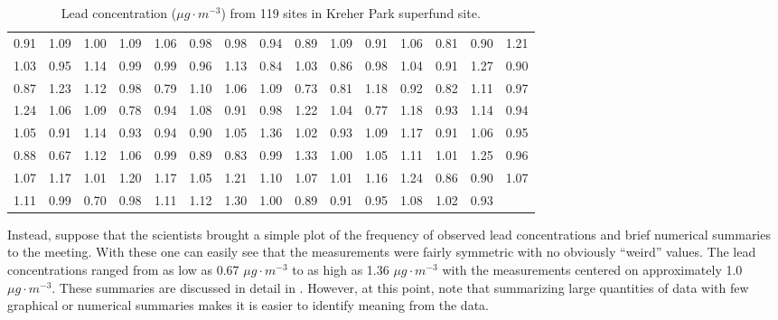 \documentclass[10pt,openany]{book}\usepackage[]{graphicx}\usepackage[]{color}
\begin{document}
\begin{table}[htbp]   \label{tab:KreherParkPbconc}
  \caption{Lead concentration ($\mu g \cdot m^{-3}$) from 119 sites in Kreher Park superfund site.}
  \begin{center}
\begin{tabular}{rrrrrrrrrrrrrrr}
  \hline
  \hline
0.91 & 1.09 & 1.00 & 1.09 & 1.06 & 0.98 & 0.98 & 0.94 & 0.89 & 1.09 & 0.91 & 1.06 & 0.81 & 0.90 & 1.21 \\ 
  1.03 & 0.95 & 1.14 & 0.99 & 0.99 & 0.96 & 1.13 & 0.84 & 1.03 & 0.86 & 0.98 & 1.04 & 0.91 & 1.27 & 0.90 \\ 
  0.87 & 1.23 & 1.12 & 0.98 & 0.79 & 1.10 & 1.06 & 1.09 & 0.73 & 0.81 & 1.18 & 0.92 & 0.82 & 1.11 & 0.97 \\ 
  1.24 & 1.06 & 1.09 & 0.78 & 0.94 & 1.08 & 0.91 & 0.98 & 1.22 & 1.04 & 0.77 & 1.18 & 0.93 & 1.14 & 0.94 \\ 
  1.05 & 0.91 & 1.14 & 0.93 & 0.94 & 0.90 & 1.05 & 1.36 & 1.02 & 0.93 & 1.09 & 1.17 & 0.91 & 1.06 & 0.95 \\ 
  0.88 & 0.67 & 1.12 & 1.06 & 0.99 & 0.89 & 0.83 & 0.99 & 1.33 & 1.00 & 1.05 & 1.11 & 1.01 & 1.25 & 0.96 \\ 
  1.07 & 1.17 & 1.01 & 1.20 & 1.17 & 1.05 & 1.21 & 1.10 & 1.07 & 1.01 & 1.16 & 1.24 & 0.86 & 0.90 & 1.07 \\ 
  1.11 & 0.99 & 0.70 & 0.98 & 1.11 & 1.12 & 1.30 & 1.00 & 0.89 & 0.91 & 0.95 & 1.08 & 1.02 & 0.93 &  \\ 
   \hline
\end{tabular}

  \end{center}
\end{table}

Instead, suppose that the scientists brought a simple plot of the frequency of observed lead concentrations and brief numerical summaries  to the meeting. With these one can easily see that the measurements were fairly symmetric with no obviously ``weird'' values. The lead concentrations ranged from as low as 0.67 $\mu g \cdot m^{-3}$ to as high as 1.36 $\mu g \cdot m^{-3}$ with the measurements centered on approximately 1.0 $\mu g \cdot m^{-3}$. These summaries are discussed in detail in . However, at this point, note that summarizing large quantities of data with few graphical or numerical summaries makes it is easier to identify meaning from the data.
\end{document}
